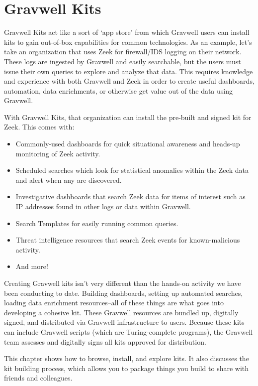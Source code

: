 \chapter{Gravwell Kits}
\label{ch:kits}
Gravwell Kits act like a sort of `app store' from which Gravwell users can
install kits to gain out-of-box capabilities for common technologies. As
an example, let's take an organization that uses Zeek for firewall/IDS
logging on their network. These logs are ingested by Gravwell and easily
searchable, but the users must issue their own queries to explore and
analyze that data. This requires knowledge and experience with both
Gravwell and Zeek in order to create useful dashboards, automation,
data enrichments, or otherwise get value out of the data using Gravwell.

With Gravwell Kits, that organization can install the pre-built and
signed kit for Zeek. This comes with:

\begin{itemize}
\tightlist
\item
  Commonly-used dashboards for quick situational awareness and heads-up
  monitoring of Zeek activity.
\item
  Scheduled searches which look for statistical anomalies within the
  Zeek data and alert when any are discovered.
\item
  Investigative dashboards that search Zeek data for items of interest
  such as IP addresses found in other logs or data within Gravwell.
\item
  Search Templates for easily running common queries.
\item
  Threat intelligence resources that search Zeek events for
  known-malicious activity.
\item
  And more!
\end{itemize}

Creating Gravwell kits isn't very different than the hands-on activity we
have been conducting to date. Building dashboards, setting up automated
searches, loading data enrichment resources--all of these things are
what goes into developing a cohesive kit. These Gravwell resources are
bundled up, digitally signed, and distributed via Gravwell infrastructure
to users. Because these kits can include Gravwell scripts (which are
Turing-complete programs), the Gravwell team assesses and digitally
signs all kits approved for distribution.

This chapter shows how to browse, install, and explore kits. It also
discusses the kit building process, which allows you to package things
you build to share with friends and colleagues.

